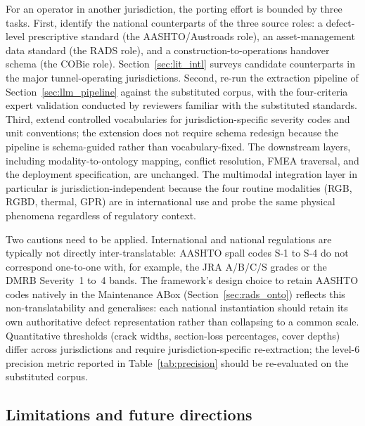 \documentclass[11pt,a4paper]{article}
\begin{document}
For an operator in another jurisdiction, the porting effort is bounded by three tasks. First, identify the national counterparts of the three source roles: a defect-level prescriptive standard (the AASHTO/Austroads role), an asset-management data standard (the RADS role), and a construction-to-operations handover schema (the COBie role). Section~\ref{sec:lit_intl} surveys candidate counterparts in the major tunnel-operating jurisdictions. Second, re-run the extraction pipeline of Section~\ref{sec:llm_pipeline} against the substituted corpus, with the four-criteria expert validation conducted by reviewers familiar with the substituted standards. Third, extend controlled vocabularies for jurisdiction-specific severity codes and unit conventions; the extension does not require schema redesign because the pipeline is schema-guided rather than vocabulary-fixed. The downstream layers, including modality-to-ontology mapping, conflict resolution, FMEA traversal, and the deployment specification, are unchanged. The multimodal integration layer in particular is jurisdiction-independent because the four routine modalities (RGB, RGBD, thermal, GPR) are in international use and probe the same physical phenomena regardless of regulatory context.

Two cautions need to be applied. International and national regulations are typically not directly inter-translatable: AASHTO spall codes S-1 to S-4 do not correspond one-to-one with, for example, the JRA A/B/C/S grades or the DMRB Severity~1 to~4 bands. The framework's design choice to retain AASHTO codes natively in the Maintenance ABox (Section~\ref{sec:rads_onto}) reflects this non-translatability and generalises: each national instantiation should retain its own authoritative defect representation rather than collapsing to a common scale. Quantitative thresholds (crack widths, section-loss percentages, cover depths) differ across jurisdictions and require jurisdiction-specific re-extraction; the level-6 precision metric reported in Table~\ref{tab:precision} should be re-evaluated on the substituted corpus.

\subsection{Limitations and future directions}
\label{sec:future}
\end{document}
